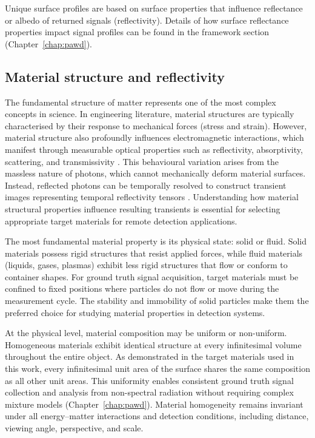 \documentclass[12pt,a4paper,oneside]{report}
\begin{document}
Unique surface profiles are based on surface properties that influence reflectance or albedo of returned signals (reflectivity). Details of how surface reflectance properties impact signal profiles can be found in the framework section (Chapter~\ref{chap:pawd}).

\subsection{Material structure and reflectivity}
\label{subsec:material_structure_reflectivity}

The fundamental structure of matter represents one of the most complex concepts in science. In engineering literature, material structures are typically characterised by their response to mechanical forces (stress and strain). However, material structure also profoundly influences electromagnetic interactions, which manifest through measurable optical properties such as reflectivity, absorptivity, scattering, and transmissivity \cite{elachi2021,griffiths2017}. This behavioural variation arises from the massless nature of photons, which cannot mechanically deform material surfaces. Instead, reflected photons can be temporally resolved to construct transient images representing temporal reflectivity tensors \cite{su2016,jungerman2022}. Understanding how material structural properties influence resulting transients is essential for selecting appropriate target materials for remote detection applications.

The most fundamental material property is its physical state: solid or fluid. Solid materials possess rigid structures that resist applied forces, while fluid materials (liquids, gases, plasmas) exhibit less rigid structures that flow or conform to container shapes. For ground truth signal acquisition, target materials must be confined to fixed positions where particles do not flow or move during the measurement cycle. The stability and immobility of solid particles make them the preferred choice for studying material properties in detection systems.

At the physical level, material composition may be uniform or non-uniform. Homogeneous materials exhibit identical structure at every infinitesimal volume throughout the entire object. As demonstrated in the target materials used in this work, every infinitesimal unit area of the surface shares the same composition as all other unit areas. This uniformity enables consistent ground truth signal collection and analysis from non-spectral radiation without requiring complex mixture models (Chapter~\ref{chap:pawd}). Material homogeneity remains invariant under all energy--matter interactions and detection conditions, including distance, viewing angle, perspective, and scale.
\end{document}
